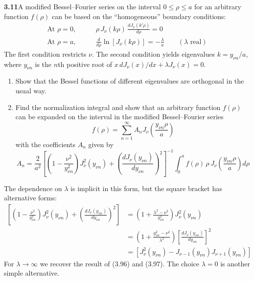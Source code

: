 \par\bigskip
\noindent\textbf{3.11}\quad A modified Bessel--Fourier series on the interval $0\leq\rho\leq a$ for an arbitrary function $f(\rho)$ can be based on the ``homogeneous'' boundary conditions:
\begin{align*}
\text{At }\rho=0,&\qquad \rho\,J_{\nu}(k\rho)\,\frac{dJ_{\nu}(k'\rho)}{d\rho}=0\\
\text{At }\rho=a,&\qquad \frac{d}{d\rho}\ln[J_{\nu}(k\rho)]=-\frac{\lambda}{a}\qquad(\lambda\text{ real})
\end{align*}
The first condition restricts $\nu$. The second condition yields eigenvalues $k=y_{\nu n}/a$, where $y_{\nu n}$ is the $n$th positive root of $x\,dJ_{\nu}(x)/dx+\lambda J_{\nu}(x)=0$.
\begin{enumerate}
\item[(a)] Show that the Bessel functions of different eigenvalues are orthogonal in the usual way.
\item[(b)] Find the normalization integral and show that  an arbitrary function $f(\rho)$ can be expanded on the interval in the modified Bessel--Fourier series
\[
f(\rho)=\sum_{n=1}^{\infty}A_{n}J_{\nu}\!\left(\frac{y_{\nu n}\rho}{a}\right)
\]
with the coefficients $A_{n}$ given by
\[
A_{n}=\frac{2}{a^{2}}\left[\left(1-\frac{\nu^{2}}{y_{\nu n}^{2}}\right)\!J_{\nu}^{2}(y_{\nu n})+\left(\frac{dJ_{\nu}(y_{\nu n})}{dy_{\nu n}}\right)^{2}\right]^{-1}\int_{0}^{a}f(\rho)\,\rho\,J_{\nu}\!\left(\frac{y_{\nu n}\rho}{a}\right)d\rho
\]
\end{enumerate}
The dependence on $\lambda$ is implicit in this form, but the square bracket has alternative forms:
\begin{align*}
\left[\left(1-\frac{\nu^{2}}{y_{\nu n}^{2}}\right)\!J_{\nu}^{2}(y_{\nu n})+\left(\frac{dJ_{\nu}(y_{\nu n})}{dy_{\nu n}}\right)^{2}\right]
&=\left(1+\frac{\lambda^{2}-\nu^{2}}{y_{\nu n}^{2}}\right)\!J_{\nu}^{2}(y_{\nu n})\\
&=\left(1+\frac{y_{\nu n}^{2}-\nu^{2}}{\lambda^{2}}\right)\!\left[\frac{dJ_{\nu}(y_{\nu n})}{dy_{\nu n}}\right]^{2}\\
&=\left[J_{\nu}^{2}(y_{\nu n})-J_{\nu-1}(y_{\nu n})J_{\nu+1}(y_{\nu n})\right]
\end{align*}
For $\lambda\to\infty$ we recover the result of (3.96) and (3.97). The choice $\lambda=0$ is another simple alternative.

\solution

